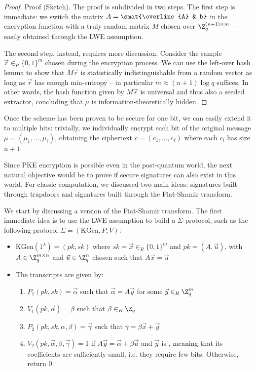 \documentclass[a4paper, 12pt]{report}
\begin{document}
    \begin{proof}{Proof (Sketch).}
        The proof is subdivided in two steps. The first step is immediate: we  switch the matrix $A = \smat{\overline{A} & b}$ in the encryption function with a truly random matrix $M$ chosen over $\Z_q^{(n+1) \times m}$ -- easily obtained through the LWE assumption.

        The second step, instead, requires more discussion. Consider the sample $\vec r \in_R \{0,1\}^m$ chosen during the encryption process. We can use the left-over hash lemma to show that $M \vec{r}$ is statistically indistinguishable from a random vector as long as $\vec r$ has enough min-entropy -- in particular $m \approx (n+1) \log q$ suffices. In other words, the hash function given by $M \vec r$ is universal and thus also a seeded extractor, concluding that $\mu$ is information-theoretically hidden.
    \end{proof}

    Once the scheme has been proven to be secure for one bit, we can easily extend it to multiple bits: trivially, we individually encrypt each bit of the original message $\mu = (\mu_1, \ldots, \mu_\ell)$, obtaining the ciphertext $c = (c_1, \ldots, c_\ell)$ where each $c_i$ has size $n+1$.

    Since PKE encryption is possible even in the post-quantum world, the next natural objective would be to prove if secure signatures can also exist in this world. For classic computation, we discussed two main ideas: signatures built through trapdoors and signatures built through the Fiat-Shamir transform. 

    We start by discussing a  version of the Fiat-Shamir transform. The first immediate idea is to use the LWE assumption to build a $\Sigma$-protocol, such as the following protocol $\Sigma = (\mathrm{KGen}, P, V)$:
    \begin{itemize}
        \item $\mathrm{KGen}(1^\lambda) = (pk, sk)$ where $sk = \vec x \in_R \{0,1\}^m$ and $pk = (A, \vec u)$, with $A \in \Z_q^{m \times n}$ and $\vec u \in \Z_q^n$ chosen such that $A \vec x = \vec u$
        \item The transcripts are given by:
        \begin{enumerate}
            \item $P_1(pk,sk) = \vec \alpha$ such that $\vec \alpha = A \vec y$ for some $\vec y \in_R \Z_q^m$
            \item $V_1(pk, \vec \alpha) = \beta$ such that $\beta \in_R \Z_q$
            \item $P_2(pk,sk,\alpha, \beta) = \vec \gamma$ such that $\gamma = \beta \vec x + \vec y$
            \item $V_2(pk, \vec \alpha, \beta, \vec \gamma) = 1$ if $A \vec y = \vec \alpha + \beta \vec u$ and $\vec y$ is , meaning that its coefficients are sufficiently small, i.e. they require few bits. Otherwise, return $0$.
        \end{enumerate}
    \end{itemize}
\end{document}
